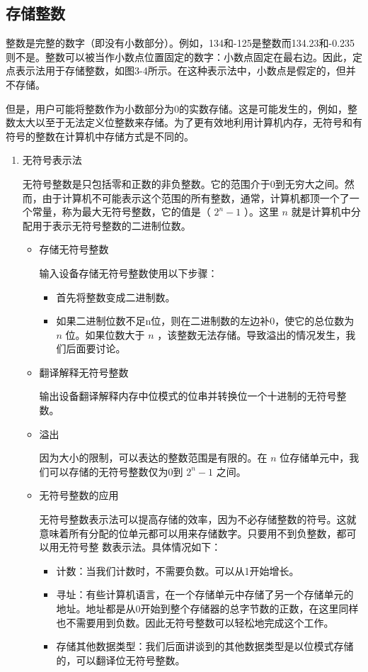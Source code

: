 \subsection{存储整数}
整数是完整的数字（即没有小数部分）。例如，134和-125是整数而134.23和-0.235则不是。整数可以被当作小数点位置固定的数字：小数点固定在最右边。因此，定点表示法用于存储整数，如图3-4所示。在这种表示法中，小数点是假定的，但并不存储。

但是，用户可能将整数作为小数部分为0的实数存储。这是可能发生的，例如，整数太大以至于无法定义位整数来存储。为了更有效地利用计算机内存，无符号和有符号的整数在计算机中存储方式是不同的。
\begin{enumerate}
	\item 无符号表示法

	无符号整数是只包括零和正数的非负整数。它的范围介于0到无穷大之间。然而，由于计算机不可能表示这个范围的所有整数，通常，计算机都顶一个了一个常量，称为最大无符号整数，它的值是（
	$ 2^n-1$
	）。这里
	$n$
	就是计算机中分配用于表示无符号整数的二进制位数。
	\begin{itemize}
		\item 存储无符号整数

		输入设备存储无符号整数使用以下步骤：
		\begin{itemize}
			\item 首先将整数变成二进制数。
			\item 如果二进制位数不足n位，则在二进制数的左边补0，使它的总位数为
			$n$
			位。如果位数大于
			$n$
			，该整数无法存储。导致溢出的情况发生，我们后面要讨论。
		\end{itemize}
		\item 翻译解释无符号整数

		输出设备翻译解释内存中位模式的位串并转换位一个十进制的无符号整数。
		\item 溢出

		因为大小的限制，可以表达的整数范围是有限的。在
		$n$
		位存储单元中，我们可以存储的无符号整数仅为0到
		$2^n-1$
		之间。

		\item 无符号整数的应用

		无符号整数表示法可以提高存储的效率，因为不必存储整数的符号。这就意味着所有分配的位单元都可以用来存储数字。只要用不到负整数，都可以用无符号整	数表示法。具体情况如下：
		\begin{itemize}
			\item 计数：当我们计数时，不需要负数。可以从1开始增长。
			\item 寻址：有些计算机语言，在一个存储单元中存储了另一个存储单元的地址。地址都是从0开始到整个存储器的总字节数的正数，在这里同样也不需要用到负数。因此无符号整数可以轻松地完成这个工作。
			\item 存储其他数据类型：我们后面讲谈到的其他数据类型是以位模式存储的，可以翻译位无符号整数。
		\end{itemize}


\end{itemize}
\end{enumerate}
